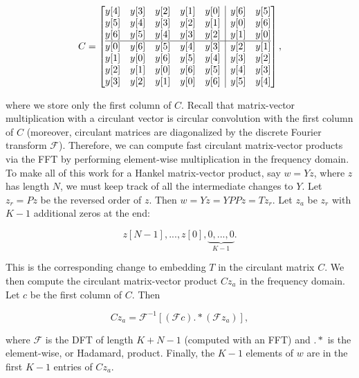 \documentclass[journal]{IEEEtran}
\begin{document}
   \[ C = \left[\begin{array}{@{}ccccc|cc@{}}
                y[4] & y[3] & y[2] & y[1] & y[0] & y[6] & y[5]\\
                y[5] & y[4] & y[3] & y[2] & y[1] & y[0] & y[6]\\
                y[6] & y[5] & y[4] & y[3] & y[2] & y[1] & y[0]\\
                \hline
                y[0] & y[6] & y[5] & y[4] & y[3] & y[2] & y[1]\\
                y[1] & y[0] & y[6] & y[5] & y[4] & y[3] & y[2]\\
                y[2] & y[1] & y[0] & y[6] & y[5] & y[4] & y[3]\\
                y[3] & y[2] & y[1] & y[0] & y[6] & y[5] & y[4]\\
                \end{array}\right], \] 

\noindent where we store only the first column of $C$.  Recall that matrix-vector multiplication with a circulant vector is circular convolution with the first column of $C$ (moreover, circulant matrices are diagonalized by the discrete Fourier transform $\mathcal{F}$).  Therefore, we can compute fast circulant matrix-vector products via the FFT by performing element-wise multiplication in the frequency domain.\\

To make all of this work for a Hankel matrix-vector product, say $w=Yz$, where $z$ has length $N$, we must keep track of all the intermediate changes to $Y$.  Let $z_r = Pz$ be the reversed order of $z$.  Then ${w=Yz=YPPz=Tz_r}$.  Let $z_a$ be $z_r$ with $K-1$ additional zeros at the end:

\[ z[N-1], ..., z[0], \underbrace{0, ..., 0}_{K-1}. \]

\noindent This is the corresponding change to embedding $T$ in the circulant matrix $C$.  We then compute the circulant matrix-vector product $Cz_a$ in the frequency domain.  Let $c$ be the first column of $C$.  Then

\[ Cz_a = \mathcal{F}^{-1}\left[\left(\mathcal{F}c\right).*\left(\mathcal{F}z_a\right)\right], \] 

\noindent where $\mathcal{F}$ is the DFT of length $K+N-1$ (computed with an FFT) and $.*$ is the element-wise, or Hadamard, product.  Finally, the $K-1$ elements of $w$ are in the first $K-1$ entries of $Cz_a$.\\
\end{document}
